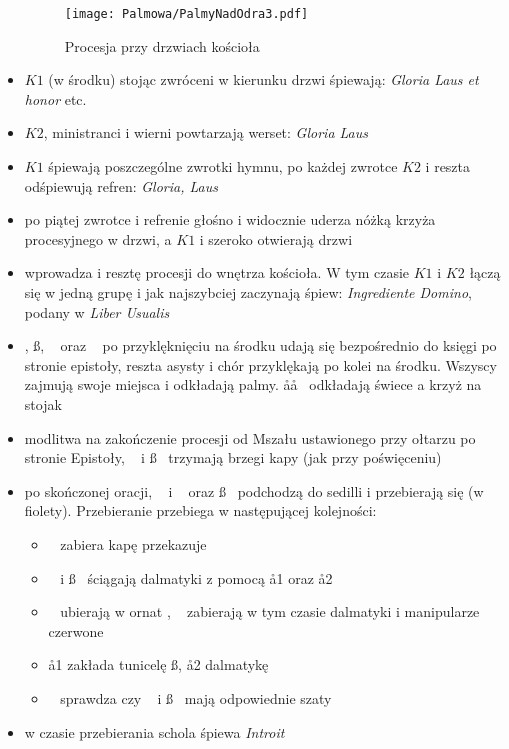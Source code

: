 \begin{itemize}
	      \begin{figure}[h]
		      \centering
		      \texttt{[image: Palmowa/PalmyNadOdra3.pdf]}
		      \caption{Procesja przy drzwiach kościoła}
		      \label{fig:procesja}
	      \end{figure}

	\item $K1$ (w środku) stojąc zwróceni w kierunku drzwi śpiewają:
	      \textit{Gloria Laus et honor} etc.
	\item $K2$, ministranci i wierni powtarzają werset: \textit{Gloria Laus}
	\item $K1$ śpiewają poszczególne zwrotki hymnu, po każdej zwrotce
	      $K2$ i reszta odśpiewują refren: \textit{Gloria, Laus}
	\item po piątej zwrotce i refrenie  głośno i widocznie uderza nóżką
	      krzyża procesyjnego w drzwi, a $K1$ i  szeroko otwierają drzwi
	\item {} wprowadza  i resztę procesji do wnętrza kościoła. W tym
	      czasie $K1$ i $K2$ łączą się w jedną grupę i jak najszybciej zaczynają
	      śpiew: \textit{Ingrediente Domino}, podany w
	      \textit{Liber Usualis}
	\item \dd, \ss, \ii~ oraz \cc~ po przyklęknięciu na środku udają się
	      bezpośrednio do księgi po stronie epistoły, reszta asysty i chór
	      przyklękają po kolei na środku. Wszyscy zajmują swoje miejsca i
	      odkładają palmy. \aa\aa~ odkładają świece a  krzyż na stojak
	\item modlitwa na zakończenie procesji od Mszału ustawionego przy ołtarzu po
	      stronie Epistoły, \dd~ i \ss~ trzymają brzegi kapy (jak przy poświęceniu)
	\item po skończonej oracji, \ii~ i \dd~ oraz \ss~ podchodzą do sedilli i
	      przebierają się (w {\color{violet}fiolety}). Przebieranie przebiega w
	      następującej kolejności:

	      \begin{itemize}
		      \item \cc~ zabiera kapę przekazuje \zz
		      \item \dd~ i \ss~ ściągają dalmatyki z pomocą \aa1 oraz \aa2
		      \item \cc~ ubierają w ornat \ii, \zz~ zabierają w tym
		            czasie dalmatyki i manipularze czerwone
		      \item \aa1 zakłada tunicelę \ss, \aa2 dalmatykę \dd
		      \item \cc~ sprawdza czy \dd~ i \ss~ mają odpowiednie szaty
	      \end{itemize}

	\item w czasie przebierania schola śpiewa \textit{Introit}
\end{itemize}